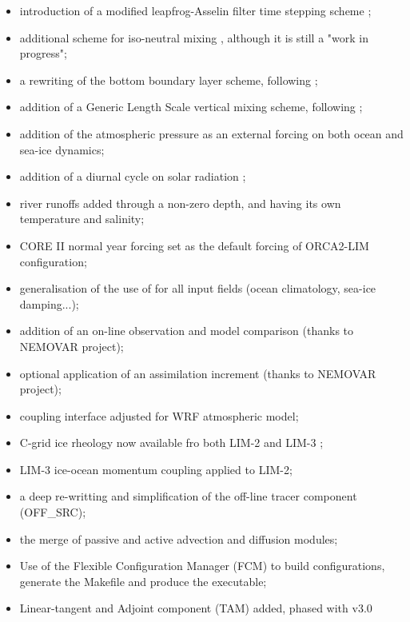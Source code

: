 \documentclass[../main/NEMO_manual]{subfiles}
\begin{document}
\begin{itemize}
\item
  introduction of a modified leapfrog-Asselin filter time stepping scheme
  \citep{leclair.madec_OM09}; 
\item
  additional scheme for iso-neutral mixing \citep{griffies.gnanadesikan.ea_JPO98}, although it is still a "work in progress";
\item
  a rewriting of the bottom boundary layer scheme, following \citet{campin.goosse_T99};
\item
  addition of a Generic Length Scale vertical mixing scheme, following \citet{umlauf.burchard_JMR03};
\item
  addition of the atmospheric pressure as an external forcing on both ocean and sea-ice dynamics;
\item
  addition of a diurnal cycle on solar radiation \citep{bernie.guilyardi.ea_CD07};
\item
  river runoffs added through a non-zero depth, and having its own temperature and salinity;
\item
  CORE II normal year forcing set as the default forcing of ORCA2-LIM configuration;
\item
  generalisation of the use of  for all input fields (ocean climatology, sea-ice damping...);
\item
  addition of an on-line observation and model comparison (thanks to NEMOVAR project);
\item
  optional application of an assimilation increment (thanks to NEMOVAR project);
\item
  coupling interface adjusted for WRF atmospheric model;
\item
  C-grid ice rheology now available fro both LIM-2 and LIM-3 \citep{bouillon.maqueda.ea_OM09};
\item
  LIM-3 ice-ocean momentum coupling applied to LIM-2;
\item
  a deep re-writting and simplification of the off-line tracer component (OFF\_SRC);
\item
  the merge of passive and active advection and diffusion modules;
\item
  Use of the Flexible Configuration Manager (FCM) to build configurations,
  generate the Makefile and produce the executable;
\item
  Linear-tangent and Adjoint component (TAM) added, phased with v3.0
\end{itemize}

\vspace{1cm}
\end{document}

